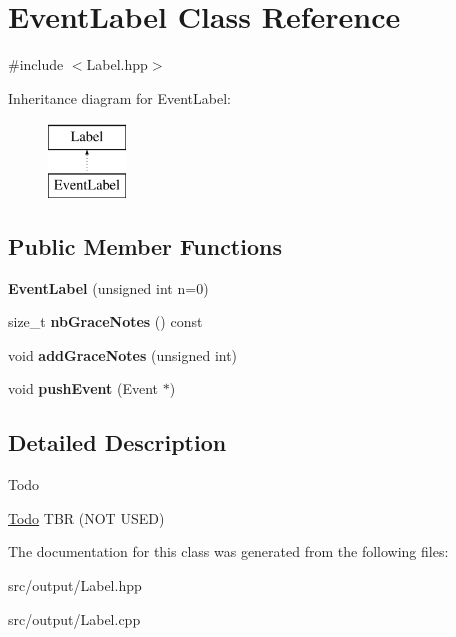 \hypertarget{classEventLabel}{}\section{Event\+Label Class Reference}
\label{classEventLabel}


{\ttfamily \#include $<$Label.\+hpp$>$}

Inheritance diagram for Event\+Label\+:\begin{figure}[H]
\begin{center}
\leavevmode
\includegraphics[height=2.000000cm]{classEventLabel}
\end{center}
\end{figure}
\subsection*{Public Member Functions}
\begin{DoxyCompactItemize}
\item 
{\bfseries Event\+Label} (unsigned int n=0)
\item 
size\+\_\+t {\bfseries nb\+Grace\+Notes} () const
\item 
void {\bfseries add\+Grace\+Notes} (unsigned int)
\item 
void {\bfseries push\+Event} (Event $\ast$)
\end{DoxyCompactItemize}


\subsection{Detailed Description}
\begin{DoxyRefDesc}{Todo}
\item[\mbox{\hyperlink{todo__todo000014}{Todo}}]T\+BR (N\+OT U\+S\+ED) \end{DoxyRefDesc}


The documentation for this class was generated from the following files\+:\begin{DoxyCompactItemize}
\item 
src/output/Label.\+hpp\item 
src/output/Label.\+cpp\end{DoxyCompactItemize}
